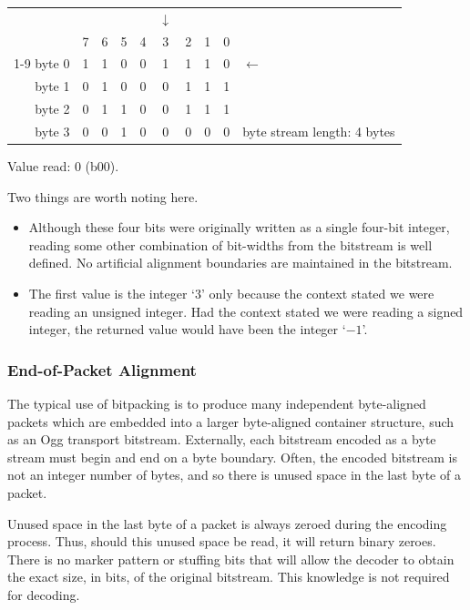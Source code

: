 \documentclass[11pt,letterpaper]{article}
\begin{document}
\begin{tabular}{rccccccccl}
                    &   &   &   &   &$\downarrow$&&&            &            \\
        \hfill\vline& 7 & 6 & 5 & 4 & 3 & 2 & 1 & 0 &            \\\cline{1-9}
byte 0  \hfill\vline& 1 & 1 & 0 & 0 & 1 & 1 & 1 & 0 &$\leftarrow$\\
byte 1  \hfill\vline& 0 & 1 & 0 & 0 & 0 & 1 & 1 & 1 &            \\
byte 2  \hfill\vline& 0 & 1 & 1 & 0 & 0 & 1 & 1 & 1 &            \\
byte 3  \hfill\vline& 0 & 0 & 1 & 0 & 0 & 0 & 0 & 0 &
byte stream length: 4 bytes
\end{tabular}
\vspace{\baselineskip}

Value read: 0 (b00).

Two things are worth noting here.
\begin{itemize}
\item
Although these four bits were originally written as a single four-bit integer,
 reading some other combination of bit-widths from the bitstream is well
 defined.
No artificial alignment boundaries are maintained in the bitstream.
\item
The first value is the integer `$3$' only because the context stated we were
 reading an unsigned integer.
Had the context stated we were reading a signed integer, the returned value
 would have been the integer `$-1$'.
\end{itemize}

\subsubsection{End-of-Packet Alignment}

The typical use of bitpacking is to produce many independent byte-aligned
 packets which are embedded into a larger byte-aligned container structure,
 such as an Ogg transport bitstream.
Externally, each bitstream encoded as a byte stream must begin and end on a
 byte boundary.
Often, the encoded bitstream is not an integer number of bytes, and so there is
 unused space in the last byte of a packet.

Unused space in the last byte of a packet is always zeroed during the encoding
 process.
Thus, should this unused space be read, it will return binary zeroes.
There is no marker pattern or stuffing bits that will allow the decoder to
 obtain the exact size, in bits, of the original bitstream.
This knowledge is not required for decoding.
\end{document}
